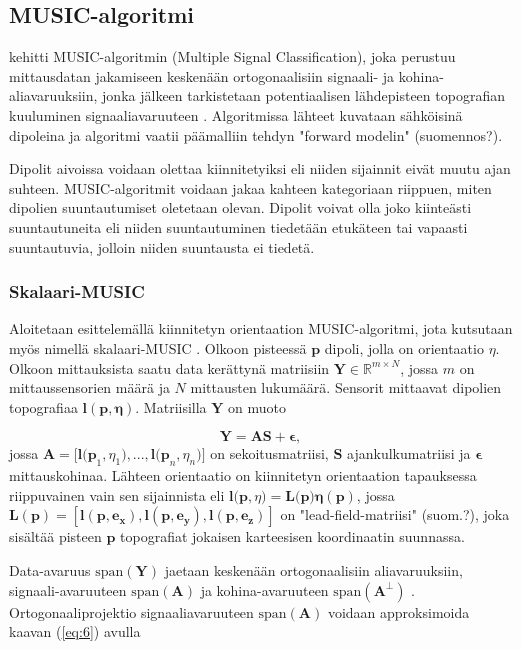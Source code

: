 \subsection{MUSIC-algoritmi}
\cite{Schmidt1986MultipleEstimation} kehitti MUSIC-algoritmin (Multiple Signal Classification), joka perustuu mittausdatan jakamiseen keskenään ortogonaalisiin signaali- ja kohina-aliavaruuksiin, jonka jälkeen tarkistetaan potentiaalisen lähdepisteen topografian kuuluminen signaaliavaruuteen \citep{Mosher1999SourceMUSIC}. Algoritmissa lähteet kuvataan sähköisinä dipoleina ja algoritmi vaatii päämalliin tehdyn "forward modelin" (suomennos?).

Dipolit aivoissa voidaan olettaa kiinnitetyiksi eli niiden sijainnit eivät muutu ajan suhteen. MUSIC-algoritmit voidaan jakaa kahteen kategoriaan riippuen, miten dipolien suuntautumiset oletetaan olevan. Dipolit voivat olla joko kiinteästi suuntautuneita eli niiden suuntautuminen tiedetään etukäteen tai vapaasti suuntautuvia, jolloin niiden suuntausta ei tiedetä. \citep{Makela2018TruncatedLocalization} 

\subsubsection{Skalaari-MUSIC}
Aloitetaan esittelemällä kiinnitetyn orientaation MUSIC-algoritmi, jota kutsutaan myös nimellä skalaari-MUSIC \citep{Makela2018TruncatedLocalization}. Olkoon pisteessä $\mathbf{p}$ dipoli, jolla on orientaatio $\eta$. Olkoon mittauksista saatu data kerättynä matriisiin $\mathbf{Y}\in \mathbb{R}^{m\times N}$, jossa $\mathit{m}$ on mittaussensorien määrä ja $\mathit{N}$ mittausten lukumäärä. Sensorit mittaavat dipolien topografiaa $\mathbf{l(p,\eta)}$. Matriisilla $\mathbf{Y}$ on muoto

\begin{equation}
    \mathbf{Y=AS+\epsilon},
\end{equation}
jossa $\mathbf{A =[l(p}_1,\eta_1),...,\mathbf{l(p}_n,\eta_n)]$ on sekoitusmatriisi, $\mathbf{S}$ ajankulkumatriisi ja $\mathbf{\epsilon}$ mittauskohinaa. Lähteen orientaatio on kiinnitetyn orientaation tapauksessa riippuvainen vain sen sijainnista eli $\mathbf{l(p},\eta)=\mathbf{L(p})\mathbf{\eta}(\mathbf{p})$, jossa $\mathbf{L(p) = [l(p,e_x),l(p,e_y),l(p,e_z)]}$ on "lead-field-matriisi" (suom.?), joka sisältää pisteen $\mathbf{p}$ topografiat jokaisen karteesisen koordinaatin suunnassa. 

Data-avaruus $\text{span}(\mathbf{Y})$ jaetaan keskenään ortogonaalisiin aliavaruuksiin, signaali-avaruuteen $\text{span}(\mathbf{A})$  ja kohina-avaruuteen $\text{span}(\mathbf{A^\bot})$  \citep{Mosher1999SourceMUSIC}. Ortogonaaliprojektio signaaliavaruuteen $\text{span}(\mathbf{A})$ voidaan approksimoida kaavan (\ref{eq:6}) avulla

